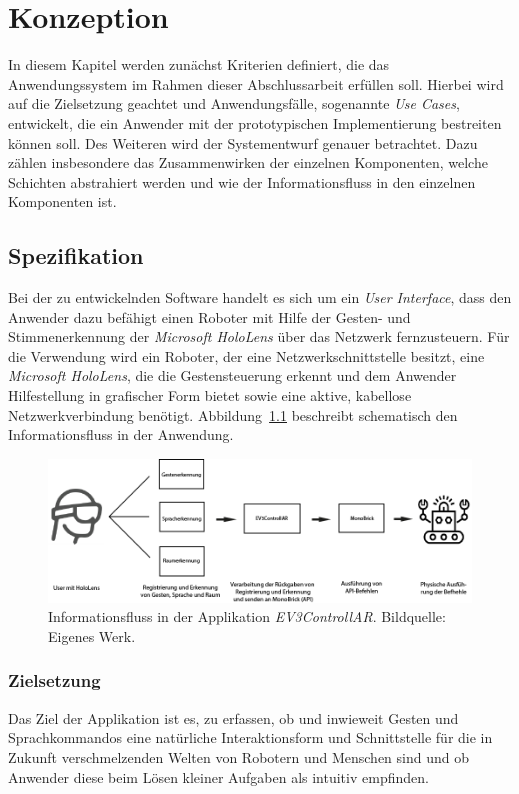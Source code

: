 \chapter{Konzeption}\label{chapter:Konzeption}
In diesem Kapitel werden zunächst Kriterien definiert, die das Anwendungssystem im Rahmen dieser Abschlussarbeit erfüllen soll. Hierbei wird auf die Zielsetzung geachtet und Anwendungsfälle, sogenannte \textit{Use Cases}, entwickelt, die ein Anwender mit der prototypischen Implementierung bestreiten können soll. Des Weiteren wird der Systementwurf genauer betrachtet. Dazu zählen insbesondere das Zusammenwirken der einzelnen Komponenten, welche Schichten abstrahiert werden und wie der Informationsfluss in den einzelnen Komponenten ist.
\section{Spezifikation}
Bei der zu entwickelnden Software handelt es sich um ein \textit{User Interface}, dass den Anwender dazu befähigt einen Roboter mit Hilfe der Gesten- und Stimmenerkennung der \textit{Microsoft HoloLens} über das Netzwerk fernzusteuern. Für die Verwendung wird ein Roboter, der eine Netzwerkschnittstelle besitzt, eine \textit{Microsoft HoloLens}, die die Gestensteuerung erkennt und dem Anwender Hilfestellung in grafischer Form bietet sowie eine aktive, kabellose Netzwerkverbindung benötigt. Abbildung~\ref{fig:pipeline} beschreibt schematisch den Informationsfluss in der Anwendung.
\begin{figure}[H]
	\centering
	\includegraphics[width=1.0\textwidth]{figuren/Pipeline}
	\caption{Informationsfluss in der Applikation \textit{EV3ControllAR}. Bildquelle: Eigenes Werk.}
	\label{fig:pipeline}
\end{figure}
\subsection{Zielsetzung}
Das Ziel der Applikation ist es, zu erfassen, ob und inwieweit Gesten und Sprachkommandos eine natürliche Interaktionsform und Schnittstelle für die in Zukunft verschmelzenden Welten von Robotern und Menschen sind und ob Anwender diese beim Lösen kleiner Aufgaben als intuitiv empfinden.
